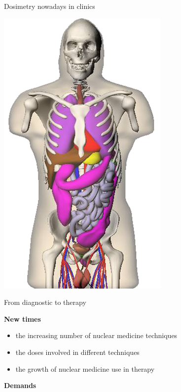\documentclass[ignorenonframetext,]{beamer}
\begin{document}
\begin{frame}{Dosimetry nowadays in clinics}
\begin{center}
\includegraphics[height=.6\textheight]{imgs/phantom2.png}
\end{center}

\end{frame}

\begin{frame}{From diagnostic to therapy}
\protect\hypertarget{from-diagnostic-to-therapy}{}

\textbf{New times}

\begin{itemize}
\item
  the increasing number of nuclear medicine techniques
\item
  the doses involved in different techniques
\item
  the growth of nuclear medicine use in therapy
\end{itemize}

\vspace{.5cm}

\textbf{Demands} \vspace{.3cm}

\begin{center}
\end{center}

\end{frame}
\end{document}
